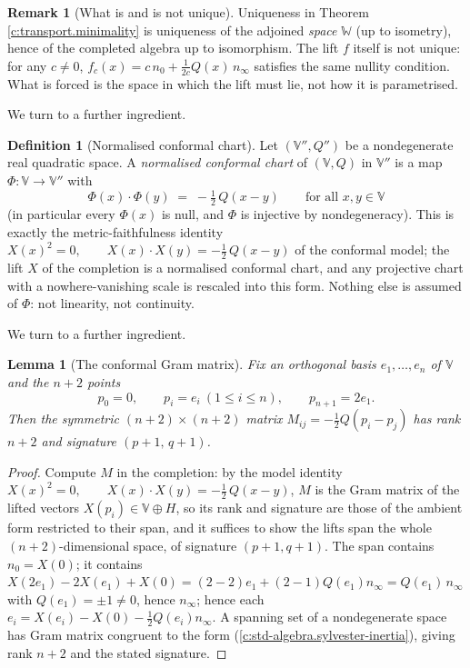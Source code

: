 \documentclass[11pt]{article}
\newtheorem{lemma}[theorem]{Lemma}
\theoremstyle{definition}
\newtheorem{definition}[theorem]{Definition}
\newtheorem{remark}[theorem]{Remark}
\theoremstyle{plain}
\providecommand{\nInf}{}\renewcommand{\nInf}{n_\infty}
\providecommand{\nO}{}\renewcommand{\nO}{n_0}
\begin{document}
\begin{remark}[What is and is not unique]\label{c:note.transport.what-not-unique}
Uniqueness in Theorem \ref{c:transport.minimality} is uniqueness of the adjoined \emph{space} $\mathbb{W}$ (up to isometry), hence of the completed algebra up to isomorphism. The lift $f$ itself is not unique: for any $c \neq 0$, $f_c(x) = c\,\nO + \tfrac{1}{2c} Q(x)\,\nInf$ satisfies the same nullity condition. What is forced is the space in which the lift must lie, not how it is parametrised.
\end{remark}

We turn to a further ingredient.

\begin{definition}[Normalised conformal chart]\label{c:obj.transport.normalised-conformal-chart}
Let $(\mathbb{V}'', Q'')$ be a nondegenerate real quadratic space. A \emph{normalised conformal chart} of $(\mathbb{V}, Q)$ in $\mathbb{V}''$ is a map $\Phi : \mathbb{V} \to \mathbb{V}''$ with
\[
\Phi(x) \cdot \Phi(y) \;=\; -\tfrac12\, Q(x - y) \qquad \text{for all } x, y \in \mathbb{V}
\]
(in particular every $\Phi(x)$ is null, and $\Phi$ is injective by nondegeneracy). This is exactly the metric-faithfulness identity $X(x)^2 = 0, \qquad X(x)\cdot X(y) = -\tfrac12\, Q(x-y)$ of the conformal model; the lift $X$ of the completion is a normalised conformal chart, and any projective chart with a nowhere-vanishing scale is rescaled into this form. Nothing else is assumed of $\Phi$: not linearity, not continuity.
\end{definition}

We turn to a further ingredient.

\begin{lemma}[The conformal Gram matrix]\label{c:transport.conformal-gram-matrix}
Fix an orthogonal basis $e_1, \dots, e_n$ of $\mathbb{V}$ and the $n + 2$ points
\[
p_0 = 0, \qquad p_i = e_i \ (1 \leq i \leq n), \qquad p_{n+1} = 2e_1 .
\]
Then the symmetric $(n{+}2) \times (n{+}2)$ matrix $M_{ij} = -\tfrac12 Q(p_i - p_j)$ has rank $n + 2$ and signature $(p{+}1,\, q{+}1)$.
\end{lemma}
\begin{proof}
Compute $M$ in the completion: by the model identity $X(x)^2 = 0, \qquad X(x)\cdot X(y) = -\tfrac12\, Q(x-y)$, $M$ is the Gram matrix of the lifted vectors $X(p_i) \in \mathbb{V} \oplus H$, so its rank and signature are those of the ambient form restricted to their span, and it suffices to show the lifts span the whole $(n{+}2)$-dimensional space, of signature $(p{+}1, q{+}1)$. The span contains $\nO = X(0)$; it contains $X(2e_1) - 2X(e_1) + X(0) = (2 - 2)e_1 + (2 - 1)Q(e_1)\nInf = Q(e_1)\,\nInf$ with $Q(e_1) = \pm 1 \neq 0$, hence $\nInf$; hence each $e_i = X(e_i) - X(0) - \tfrac12 Q(e_i)\nInf$. A spanning set of a nondegenerate space has Gram matrix congruent to the form (\ref{c:std-algebra.sylvester-inertia}), giving rank $n+2$ and the stated signature.

\end{proof}
\end{document}
